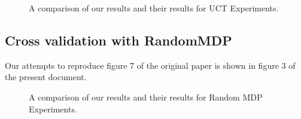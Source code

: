 \documentclass[11pt,twocolumn]{article}
\begin{document}
\begin{figure}[H]
\centering
{}
\hspace{1mm}
\caption{A comparison of our results and their results for UCT Experiments.}
\end{figure}

\subsection{Cross validation with RandomMDP}

Our attempts to reproduce figure 7 of the original paper is shown in figure 3 of the present document. 
\begin{figure}[H]
\centering
{}
\hspace{4mm}
\caption{A comparison of our results and their results for Random MDP Experiments.}
\end{figure}
\end{document}
